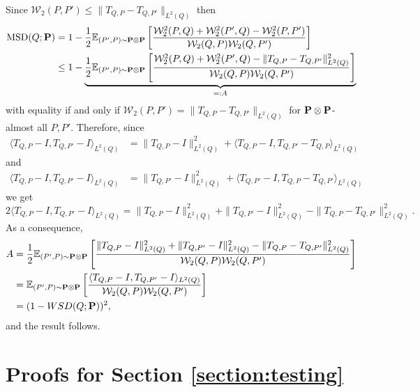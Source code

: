 \documentclass{imsart}
\numberwithin{equation}{section}
\def\E{\mathbb{E}}
\def\E{\mathbb E}
\begin{document}
Since $ \mathcal{W}_2(P,P')\leq \|T_{Q,P}-T_{Q,P'}\|_{L^2(Q)} $ then 
\begin{align*}
	\mathrm{MSD}(Q;{\bf P} )&= 1-\frac{1}{2}\E_{(P',P)\sim {\bf P} \otimes {\bf P} }\left[\frac{\mathcal{W}_2^2( P,Q)+\mathcal{W}_2^2( P',Q)-\mathcal{W}_2^2( P,P')}{\mathcal{W}_2( Q,P)\mathcal{W}_2( Q,P')} \right]\\
	&\leq 1-\underbrace{\frac{1}{2}\E_{(P',P)\sim {\bf P} \otimes {\bf P} }\left[\frac{\mathcal{W}_2^2( P,Q)+\mathcal{W}_2^2( P',Q)-\|T_{Q,P}-T_{Q,P'}\|_{L^2(Q)}^2  }{\mathcal{W}_2( Q,P)\mathcal{W}_2( Q,P')} \right]}_{=:A}
\end{align*}
with equality if and only if 
$ \mathcal{W}_2(P,P')=\|T_{Q,P}-T_{Q,P'}\|_{L^2(Q)} $ for ${\bf P} \otimes {\bf P}$-almost all
$P,P'$. Therefore, since 
\begin{align*}
	\langle T_{Q,P}-I, T_{Q,P'}-I\rangle_{L^2(Q)} &=  \| T_{Q,P}-I\|_{L^2(Q)}^2+ \langle T_{Q,P}-I,  T_{Q,P'}-T_{Q,P}\rangle_{L^2(Q)}
\end{align*}
and 
\begin{align*}
	\langle T_{Q,P}-I, T_{Q,P'}-I\rangle_{L^2(Q)} &=  \| T_{Q,P'}-I\|_{L^2(Q)}^2+ \langle T_{Q,P'}-I,  T_{Q,P}-T_{Q,P'}\rangle_{L^2(Q)}
\end{align*}
we get 
$$ 2\langle T_{Q,P}-I, T_{Q,P'}-I\rangle_{L^2(Q)} = \|T_{Q,P}-I\|_{L^2(Q)}^2+\|T_{Q,P'}-I \|_{L^2(Q)}^2-\|T_{Q,P}-T_{Q,P'}\|_{L^2(Q)}^2.  $$
As a consequence,
\begin{align*}
	A&= \frac{1}{2}\E_{(P',P)\sim {\bf P} \otimes {\bf P} }\left[\frac{\|T_{Q,P}-I\|_{L^2(Q)}^2+\|T_{Q,P'}-I \|_{L^2(Q)}^2-\|T_{Q,P}-T_{Q,P'}\|_{L^2(Q)}^2  }{\mathcal{W}_2( Q,P)\mathcal{W}_2( Q,P')} \right]\\
	&=\E_{(P',P)\sim {\bf P} \otimes {\bf P} }\left[\frac{\langle T_{Q,P}-I, T_{Q,P'}-I\rangle_{L^2(Q)}  }{\mathcal{W}_2( Q,P)\mathcal{W}_2( Q,P')} \right]\\
	&=(1- {\rm WSD}(Q;{\bf P} ))^2,
\end{align*}
and the result follows.


\section{Proofs for Section \ref{section:testing}}
\end{document}
